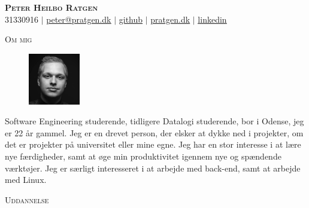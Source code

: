 \documentclass[11pt]{article}
\begin{document}
\begin{center}
  \textbf{\huge{\scshape{Peter Heilbo Ratgen}}}\\ 
  \vspace{0.2cm}
  \small 31330916 $|$
  \href{mailto:peter@pratgen.dk}{\underline{peter@pratgen.dk}} $|$
  \href{https://github.com/PeterRatgen }{\underline{github}} $|$
  \href{https://pratgen.dk}{\underline{pratgen.dk}} $|$
  \href{https://www.linkedin.com/in/peter-ratgen-a1236529/}{\underline{linkedin}}
\end{center}

\noindent\large{\scshape{Om mig}} \newline
\noindent{\rule[0.3cm]{\textwidth}{0.4pt}}

\begin{figure}
  \vspace{-0.7cm}
  \includegraphics[width=0.2\textwidth, right]{./okay.jpg}
\end{figure}
\normalsize Software Engineering studerende, tidligere Datalogi studerende, bor
i Odense, jeg er 22 år gammel. Jeg er en drevet person, der elsker at dykke ned
i projekter, om det er projekter på universitet eller mine egne. Jeg har en stor
interesse i at lære nye færdigheder, samt at øge min produktivitet igennem nye
og spændende værktøjer. Jeg er særligt interesseret i at arbejde med back-end,
samt at arbejde med Linux.

\vspace{0.3cm}
\noindent\large{\scshape{Uddannelse}} \newline
\noindent{\rule[0.3cm]{\textwidth}{0.4pt}}
\end{document}
